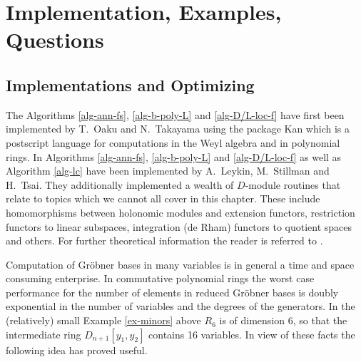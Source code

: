 %
\section{Implementation, Examples, Questions}
\subsection{Implementations and Optimizing}
The Algorithms \ref{alg-ann-fs}, \ref{alg-b-poly-L} and \ref{alg-D/L-loc-f} 
have first been implemented by
T.\ Oaku
  and N.\ Takayama 
using the package Kan \cite{DM:T} which
is a postscript language for computations in the Weyl algebra and in
polynomial rings. 
In \Mtwo Algorithms  \ref{alg-ann-fs},
\ref{alg-b-poly-L} and \ref{alg-D/L-loc-f} as well as Algorithm 
\ref{alg-lc}
have been implemented by A.~Leykin, M.~Stillman and H.~Tsai. They additionally
implemented a wealth of $D$-module routines that
relate to topics which we cannot all cover in this chapter. These include
homomorphisms between holonomic modules and extension functors,
restriction functors to linear subspaces, integration (de Rham)
functors to quotient spaces and others. For further theoretical 
information 
the reader is referred to \cite{DM:O-T1,DM:O-T2,DM:O-T-T,DM:SST,DM:T-W,DM:W2,DM:W4,DM:W3}. 

Computation of Gr\"obner bases in many variables is in general a time
and space consuming enterprise. In commutative polynomial
rings the worst case performance for the number of elements in reduced
Gr\"obner bases 
is doubly exponential in the number of variables and the degrees of
the generators. In the (relatively) small 
Example \ref{ex-minors} above $R_6$ is of dimension 6,
so that the intermediate ring $D_{n+1}[y_1,y_2]$ contains 16
variables. In view of these facts the following idea 
has proved useful. 

